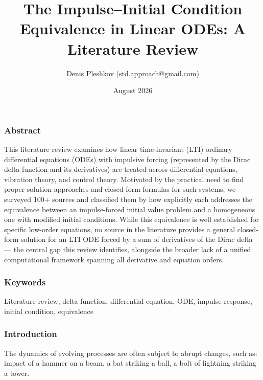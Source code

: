 \documentclass[
  11pt,
]{article}
\title{The Impulse--Initial Condition Equivalence in Linear ODEs: A
Literature Review}
\author{Denis Pleshkov (std.approach@gmail.com)}
\date{August 2026}
\begin{document}
\maketitle

\hypertarget{abstract}{%
\subsubsection{Abstract}\label{abstract}}

This literature review examines how linear time-invariant (LTI) ordinary
differential equations (ODEs) with impulsive forcing (represented by the
Dirac delta function and its derivatives) are treated across
differential equations, vibration theory, and control theory. Motivated
by the practical need to find proper solution approaches and closed-form
formulas for such systems, we surveyed 100+ sources and classified them
by how explicitly each addresses the equivalence between an
impulse-forced initial value problem and a homogeneous one with modified
initial conditions. While this equivalence is well established for
specific low-order equations, no source in the literature provides a
general closed-form solution for an LTI ODE forced by a sum of
derivatives of the Dirac delta --- the central gap this review
identifies, alongside the broader lack of a unified computational
framework spanning all derivative and equation orders.

\hypertarget{keywords}{%
\subsubsection{Keywords}\label{keywords}}

Literature review, delta function, differential equation, ODE, impulse
response, initial condition, equivalence

\hypertarget{introduction}{%
\subsubsection{Introduction}\label{introduction}}

The dynamics of evolving processes are often subject to abrupt changes,
such as: impact of a hammer on a beam, a bat striking a ball, a bolt of
lightning striking a tower.
\end{document}
